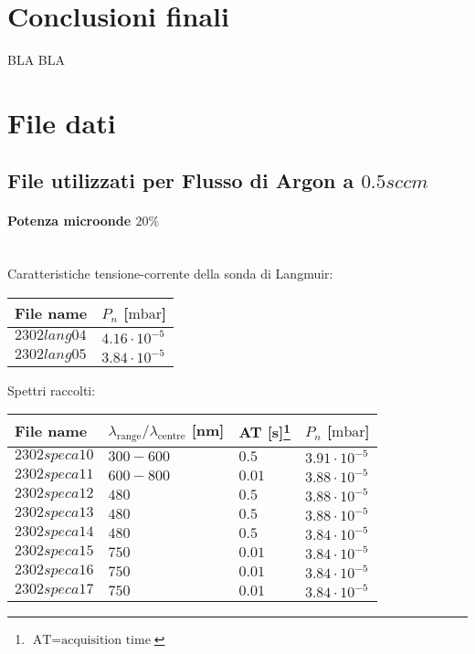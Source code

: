 \section{Conclusioni finali}
BLA BLA

\section{File dati}
\subsection{File utilizzati per Flusso di Argon a $0.5sccm$}

\paragraph*{Potenza microonde $\text{20\%}$} ~\\
Caratteristiche tensione-corrente della sonda di Langmuir:
\begin{center}
\begin{tabular}{p{3cm}p{3cm}}
\toprule
File name	&$P_{n}$ [$\si{\milli\bar}$]\\
\midrule
$2302lang04$	&$4.16\cdot10^{-5}$\\
$2302lang05$	&$3.84\cdot10^{-5}$\\
\bottomrule
\end{tabular}
\end{center}

Spettri raccolti:
\begin{center}
\begin{tabular}{p{3cm}p{4cm}p{2cm}p{3cm}}
\toprule
File name	&$\lambda_\text{range}\text{/}\lambda_\text{centre}$ [nm] &AT [s]\footnote{$\text{AT}=\text{acquisition time}$} &$P_{n}$ [$\si{\milli\bar}$]\\
\midrule
$2302speca10$	&$300-600$	&$0.5$		&$3.91\cdot10^{-5}$\\
$2302speca11$	&$600-800$	&$0.01$		&$3.88\cdot10^{-5}$\\
$2302speca12$	&$480$		&$0.5$		&$3.88\cdot10^{-5}$\\
$2302speca13$	&$480$		&$0.5$		&$3.88\cdot10^{-5}$\\
$2302speca14$	&$480$		&$0.5$		&$3.84\cdot10^{-5}$\\
$2302speca15$	&$750$		&$0.01$		&$3.84\cdot10^{-5}$\\
$2302speca16$	&$750$		&$0.01$		&$3.84\cdot10^{-5}$\\
$2302speca17$	&$750$		&$0.01$		&$3.84\cdot10^{-5}$\\
\bottomrule
\end{tabular}
\end{center}

